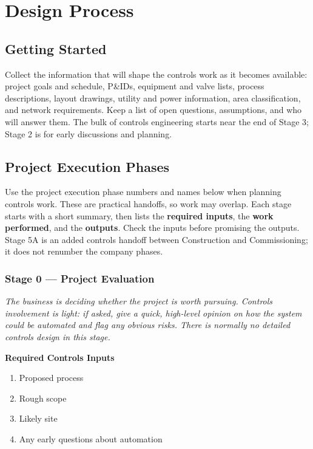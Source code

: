 \chapter{Design Process}\label{ch:design-process}
\section{Getting Started}
Collect the information that will shape the controls work as it becomes available: project goals and schedule, P\&IDs, equipment and valve lists, process descriptions, layout drawings, utility and power information, area classification, and network requirements. Keep a list of open questions, assumptions, and who will answer them. The bulk of controls engineering starts near the end of Stage 3; Stage 2 is for early discussions and planning.

\section{Project Execution Phases}
Use the project execution phase numbers and names below when planning controls work. These are practical handoffs, so work may overlap. Each stage starts with a short summary, then lists the \textbf{required inputs}, the \textbf{work performed}, and the \textbf{outputs}. Check the inputs before promising the outputs. Stage 5A is an added controls handoff between Construction and Commissioning; it does not renumber the company phases.

\newcommand{\stagelist}[1]{\par\smallskip\noindent\textbf{#1}\par\vspace{-2pt}}

\subsection{Stage 0 --- Project Evaluation}
\textit{The business is deciding whether the project is worth pursuing. Controls involvement is light: if asked, give a quick, high-level opinion on how the system could be automated and flag any obvious risks. There is normally no detailed controls design in this stage.}

\stagelist{Required Controls Inputs}
\begin{enumerate}[itemsep=1pt]
  \item Proposed process
  \item Rough scope
  \item Likely site
  \item Any early questions about automation
\end{enumerate}

